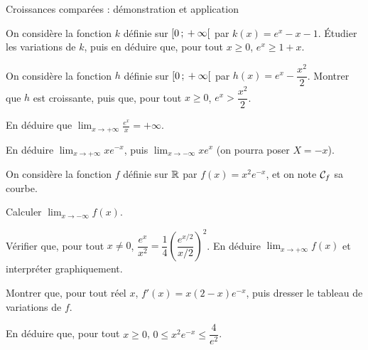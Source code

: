 \begin{exercice}[3]{Croissances comparées : démonstration et application}
\begin{questions}
  \item On considère la fonction $k$ définie sur $\mathopen{[}0\,{;}\,+\infty\mathclose{[}$ par $k(x)=e^{x}-x-1$.
    Étudier les variations de $k$, puis en déduire que, pour tout $x\geq0$, $e^{x}\geq1+x$.
  \item On considère la fonction $h$ définie sur $\mathopen{[}0\,{;}\,+\infty\mathclose{[}$ par $h(x)=e^{x}-\dfrac{x^{2}}{2}$.
    Montrer que $h$ est croissante, puis que, pour tout $x\geq0$, $e^{x}>\dfrac{x^{2}}{2}$.
  \item En déduire que $\displaystyle\lim_{x\to+\infty}\frac{e^{x}}{x}=+\infty$.
  \item En déduire $\displaystyle\lim_{x\to+\infty}xe^{-x}$, puis $\displaystyle\lim_{x\to-\infty}xe^{x}$ (on pourra poser $X=-x$).
\end{questions}
On considère la fonction $f$ définie sur $\mathbb{R}$ par $f(x)=x^{2}e^{-x}$, et on note $\mathcal{C}_f$ sa courbe.
\begin{questions}[resume]
  \item \begin{questions}
      \item Calculer $\displaystyle\lim_{x\to-\infty}f(x)$.
      \item Vérifier que, pour tout $x\neq0$, $\dfrac{e^{x}}{x^{2}}=\dfrac14\left(\dfrac{e^{x/2}}{x/2}\right)^{2}$.
        En déduire $\displaystyle\lim_{x\to+\infty}f(x)$ et interpréter graphiquement.
    \end{questions}
  \item Montrer que, pour tout réel $x$, $f'(x)=x(2-x)e^{-x}$, puis dresser le tableau de variations de $f$.
  \item En déduire que, pour tout $x\geq0$, $0\leq x^{2}e^{-x}\leq\dfrac{4}{e^{2}}$.
\end{questions}
\end{exercice}

